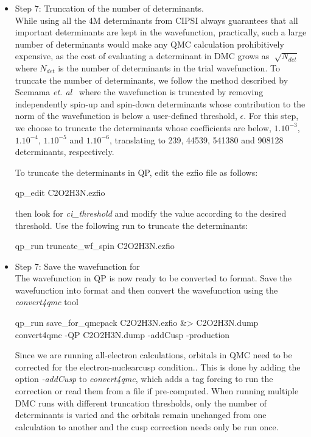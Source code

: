 \begin{itemize}
\item Step 7: Truncation of the number of determinants.\\ While using
  all the 4M determinants from CIPSI always guarantees that all
  important determinants are kept in the wavefunction, practically,
  such a large number of determinants would make any QMC calculation
  prohibitively expensive, as the cost of evaluating a determinant in
  DMC grows as $\sqrt[]{N_{det}}$ where $N_{det}$ is the number of
  determinants in the trial wavefunction. To truncate the number of
  determinants, we follow the method described by Scemama
  \textit{et. al}~\cite{Scemama2018} where the wavefunction is
  truncated by removing independently spin-up and spin-down
  determinants whose contribution to the norm of the wavefunction is
  below a user-defined threshold, $\epsilon$. For this step, we choose
  to truncate the determinants whose coefficients are below,
  $1.10^{-3}$, $1.10^{-4}$, $1.10^{-5}$ and $1.10^{-6}$, translating
  to 239, 44539, 541380 and 908128 determinants, respectively.

To  truncate the determinants in QP, edit the ezfio file as follows:

\begin{shade}
qp_edit C2O2H3N.ezfio  
\end{shade}

then look for \textit{ci\_threshold} and modify the value according to the desired threshold. Use the following run to truncate the determinants:

\begin{shade}
qp_run truncate_wf_spin C2O2H3N.ezfio  
\end{shade}

\item Step 7: Save the wavefunction for \qmcpack \\
The wavefunction in QP is now ready to be converted to \qmcpack format.
Save the wavefunction into \qmcpack format and then convert the wavefunction using the \textit{convert4qmc} tool\\

\begin{shade}
qp_run save_for_qmcpack C2O2H3N.ezfio &> C2O2H3N.dump  
convert4qmc -QP C2O2H3N.dump -addCusp -production
\end{shade}

Since we are running all-electron calculations, orbitals in QMC need
to be corrected for the electron-nuclearcusp condition..  This is done
by adding the option \textit{-addCusp} to \textit{convert4qmc}, which
adds a tag forcing \qmcpack to run the correction or read them from a
file if pre-computed. When running multiple DMC runs with different
truncation thresholds, only the number of determinants is varied and
the orbitals remain unchanged from one calculation to another and the
cusp correction needs only be run once.


\end{itemize}
